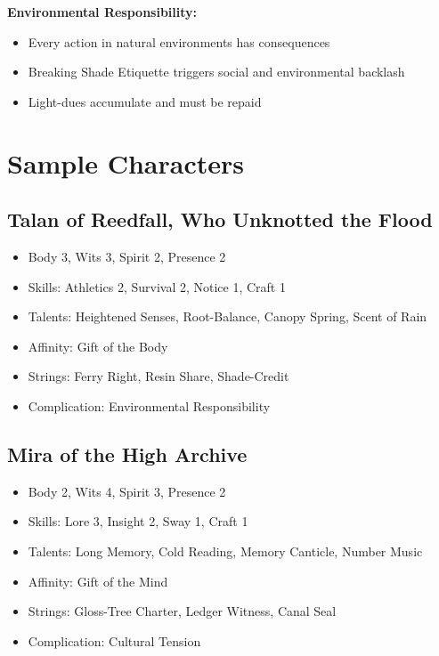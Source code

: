 \documentclass[11pt]{article}
\newcommand{\complicationtype}[1]{\textbf{#1}}
\begin{document}
\complicationtype{Environmental Responsibility:}
\begin{itemize}
  \item Every action in natural environments has consequences
  \item Breaking Shade Etiquette triggers social and environmental backlash
  \item Light-dues accumulate and must be repaid
\end{itemize}

\section*{Sample Characters}

\subsection*{Talan of Reedfall, Who Unknotted the Flood}
\begin{itemize}
  \item Body 3, Wits 3, Spirit 2, Presence 2
  \item Skills: Athletics 2, Survival 2, Notice 1, Craft 1
  \item Talents: Heightened Senses, Root-Balance, Canopy Spring, Scent of Rain
  \item Affinity: Gift of the Body
  \item Strings: Ferry Right, Resin Share, Shade-Credit
  \item Complication: Environmental Responsibility
\end{itemize}

\subsection*{Mira of the High Archive}
\begin{itemize}
  \item Body 2, Wits 4, Spirit 3, Presence 2
  \item Skills: Lore 3, Insight 2, Sway 1, Craft 1
  \item Talents: Long Memory, Cold Reading, Memory Canticle, Number Music
  \item Affinity: Gift of the Mind
  \item Strings: Gloss-Tree Charter, Ledger Witness, Canal Seal
  \item Complication: Cultural Tension
\end{itemize}
\end{document}
